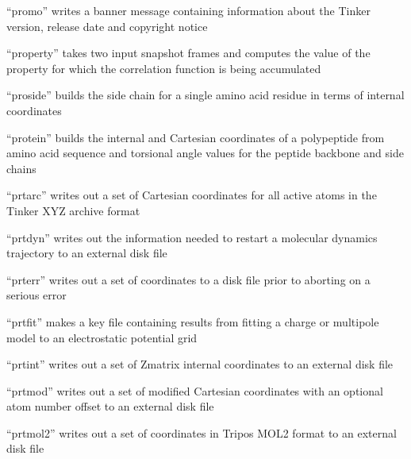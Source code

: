 \documentclass[letterpaper,11pt,english]{sphinxmanual}
\begin{document}

“promo” writes a banner message containing information
about the Tinker version, release date and copyright notice


“property” takes two input snapshot frames and computes the
value of the property for which the correlation function is
being accumulated


“proside” builds the side chain for a single amino acid
residue in terms of internal coordinates


“protein” builds the internal and Cartesian coordinates
of a polypeptide from amino acid sequence and torsional
angle values for the peptide backbone and side chains


“prtarc” writes out a set of Cartesian coordinates for
all active atoms in the Tinker XYZ archive format


“prtdyn” writes out the information needed to restart a
molecular dynamics trajectory to an external disk file


“prterr” writes out a set of coordinates to a disk
file prior to aborting on a serious error


“prtfit” makes a key file containing results from fitting a
charge or multipole model to an electrostatic potential grid


“prtint” writes out a set of Z\sphinxhyphen{}matrix internal
coordinates to an external disk file


“prtmod” writes out a set of modified Cartesian coordinates
with an optional atom number offset to an external disk file


“prtmol2” writes out a set of coordinates in Tripos MOL2
format to an external disk file

\end{document}
